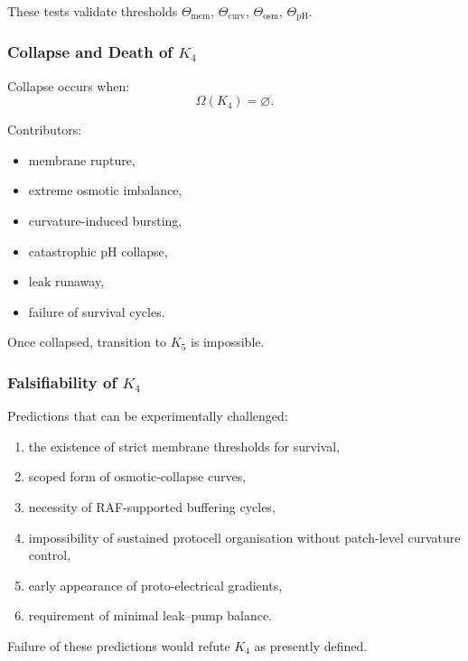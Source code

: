 These tests validate thresholds $\Theta_{\mathrm{mem}}$,
$\Theta_{\mathrm{curv}}$, $\Theta_{\mathrm{osm}}$,
$\Theta_{\mathrm{pH}}$.

\subsubsection{Collapse and Death of \texorpdfstring{$K_4$}{K_4}}

Collapse occurs when:
\[
\Omega(K_4) = \varnothing.
\]

Contributors:
\begin{itemize}
    \item membrane rupture,
    \item extreme osmotic imbalance,
    \item curvature-induced bursting,
    \item catastrophic pH collapse,
    \item leak runaway,
    \item failure of survival cycles.
\end{itemize}

Once collapsed, transition to $K_5$ is impossible.

\subsubsection{Falsifiability of \texorpdfstring{$K_4$}{K_4}}

Predictions that can be experimentally challenged:
\begin{enumerate}
    \item the existence of strict membrane thresholds for survival,
    \item scoped form of osmotic-collapse curves,
    \item necessity of RAF-supported buffering cycles,
    \item impossibility of sustained protocell organisation without
          patch-level curvature control,
    \item early appearance of proto-electrical gradients,
    \item requirement of minimal leak–pump balance.
\end{enumerate}

Failure of these predictions would refute $K_4$ as presently defined.

